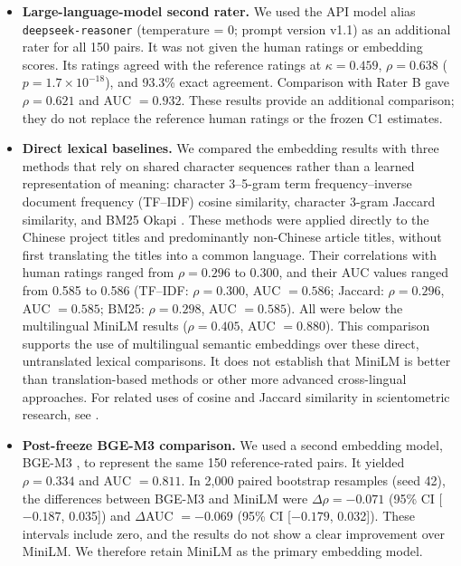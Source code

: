 \documentclass[pdflatex,sn-apa]{sn-jnl}
\begin{document}
\begin{itemize}
\item \textbf{Large-language-model second rater.} We used the API model alias \texttt{deepseek-reasoner} (temperature = 0; prompt version v1.1) as an additional rater for all 150 pairs. It was not given the human ratings or embedding scores. Its ratings agreed with the reference ratings at $\kappa=0.459$, $\rho=0.638$ ($p=1.7\times10^{-18}$), and 93.3\% exact agreement. Comparison with Rater B gave $\rho=0.621$ and AUC $=0.932$. These results provide an additional comparison; they do not replace the reference human ratings or the frozen C1 estimates.

\item \textbf{Direct lexical baselines.} We compared the embedding results with three methods that rely on shared character sequences rather than a learned representation of meaning: character 3--5-gram term frequency--inverse document frequency (TF--IDF) cosine similarity, character 3-gram Jaccard similarity, and BM25 Okapi \citep{robertson2009bm25}. These methods were applied directly to the Chinese project titles and predominantly non-Chinese article titles, without first translating the titles into a common language. Their correlations with human ratings ranged from $\rho=0.296$ to 0.300, and their AUC values ranged from 0.585 to 0.586 (TF--IDF: $\rho=0.300$, AUC $=0.586$; Jaccard: $\rho=0.296$, AUC $=0.585$; BM25: $\rho=0.298$, AUC $=0.585$). All were below the multilingual MiniLM results ($\rho=0.405$, AUC $=0.880$). This comparison supports the use of multilingual semantic embeddings over these direct, untranslated lexical comparisons. It does not establish that MiniLM is better than translation-based methods or other more advanced cross-lingual approaches. For related uses of cosine and Jaccard similarity in scientometric research, see \citet{hamers1989similarity}.

\item \textbf{Post-freeze BGE-M3 comparison.} We used a second embedding model, BGE-M3 \citep{chen2024m3embedding}, to represent the same 150 reference-rated pairs. It yielded $\rho=0.334$ and AUC $=0.811$. In 2,000 paired bootstrap resamples (seed 42), the differences between BGE-M3 and MiniLM were $\Delta\rho=-0.071$ (95\% CI [$-0.187$, 0.035]) and $\Delta$AUC $=-0.069$ (95\% CI [$-0.179$, 0.032]). These intervals include zero, and the results do not show a clear improvement over MiniLM. We therefore retain MiniLM as the primary embedding model.


\end{itemize}
\end{document}
